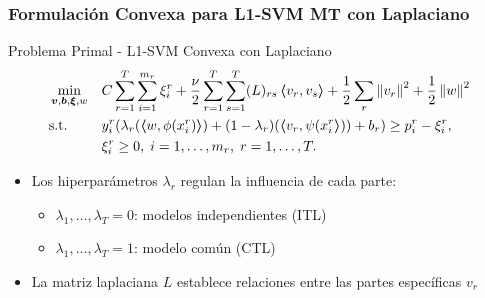 \documentclass[aspectratio=43]{beamer}
\newcommand{\norm}[1]{\left\lVert#1\right\rVert}
\newcommand{\myvec}[1]{\bm{#1}}
\newcommand{\fv}[1]{\myvec{#1}}
\newcommand{\dotp}[2]{\bm{\left\langle} #1, #2 \bm{\right\rangle}}
\newcommand{\ntasks}{T}
\newcommand{\npertask}{m}
\begin{document}
\begin{frame}
      \frametitle{Formulación Convexa para L1-SVM MT con Laplaciano}
  
      \begin{block}{Problema Primal - L1-SVM Convexa con Laplaciano}
            \begin{equation}\nonumber
                  \begin{aligned}
                       & \min_{\fv{v}, \fv{b}, \fv{\xi}, w}
                       &                                             & { C \sum_{r=1}^\ntasks \sum_{i=1}^{\npertask_r} {\xi_i^r}  + \frac{\nu}{2} \sum_{r=1}^\ntasks \sum_{s=1}^T (L)_{rs} \dotp{v_r}{v_s} + \frac{1}{2} \sum_r \norm{{v}_r}^2 + \frac{1}{2} \norm{{w}}^2}                                                                              \\
                       & \text{s.t.}
                       &                                             & y_i^r (\lambda_r (\dotp{w}{\phi({x}_i^r)}) + (1 - \lambda_r) (\dotp{{v}_r}{\psi({x}_i^r})) + b_r) \geq p_i^r - \xi_i^r  ,                                                                                                                                                                            \\
                       &                                             &                                                                                                                                                                                                           & \xi_i^r \geq 0,  \;  i = 1, \dotsc, \npertask_r, \; r=1, \dotsc, \ntasks .
                  \end{aligned}
              \end{equation}
      \end{block}
      \begin{itemize}
            \item Los hiperparámetros $\lambda_r$ regulan la influencia de cada parte:
            \begin{itemize}
                \item $\lambda_1, \ldots, \lambda_\ntasks=0$: modelos independientes (ITL)
                \item $\lambda_1, \ldots, \lambda_\ntasks=1$: modelo común (CTL)
            \end{itemize}
            \item La matriz laplaciana $L$ establece relaciones entre las partes específicas $v_r$
      \end{itemize}

\end{frame}
\end{document}
